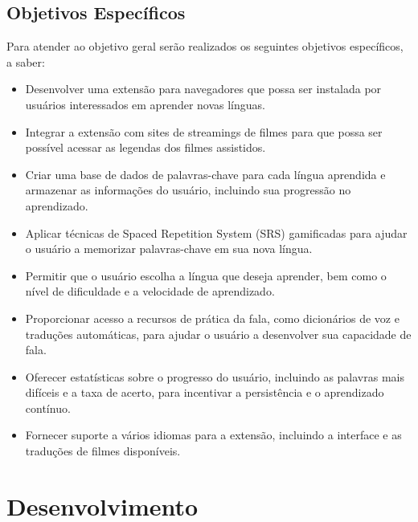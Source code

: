 \documentclass[12pt]{article}
\begin{document}
\subsection{Objetivos Específicos}
Para atender ao objetivo geral serão realizados os seguintes objetivos específicos, a saber:
\begin{itemize}
\item Desenvolver uma extensão para navegadores que possa ser instalada por usuários interessados em aprender novas línguas.
\item Integrar a extensão com sites de streamings de filmes para que possa ser possível acessar as legendas dos filmes assistidos.
\item Criar uma base de dados de palavras-chave para cada língua aprendida e armazenar as informações do usuário, incluindo sua progressão no aprendizado.
\item Aplicar técnicas de Spaced Repetition System (SRS) gamificadas para ajudar o usuário a memorizar palavras-chave em sua nova língua.
\item Permitir que o usuário escolha a língua que deseja aprender, bem como o nível de dificuldade e a velocidade de aprendizado.
\item Proporcionar acesso a recursos de prática da fala, como dicionários de voz e traduções automáticas, para ajudar o usuário a desenvolver sua capacidade de fala.
\item Oferecer estatísticas sobre o progresso do usuário, incluindo as palavras mais difíceis e a taxa de acerto, para incentivar a persistência e o aprendizado contínuo.
\item Fornecer suporte a vários idiomas para a extensão, incluindo a interface e as traduções de filmes disponíveis.
\end{itemize}



\section{Desenvolvimento}
\end{document}
